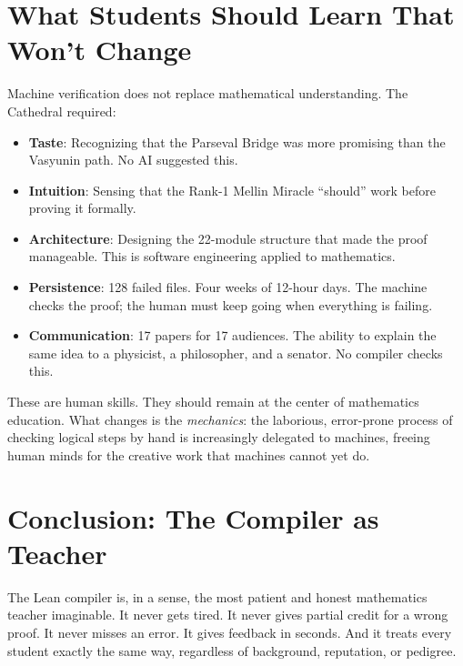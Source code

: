 \documentclass[11pt,a4paper]{article}
\begin{document}
\section{What Students Should Learn That Won't Change}

Machine verification does not replace mathematical understanding.
The Cathedral required:

\begin{itemize}
  \item \textbf{Taste}: Recognizing that the Parseval Bridge was
    more promising than the Vasyunin path. No AI suggested this.
  \item \textbf{Intuition}: Sensing that the Rank-1 Mellin Miracle
    ``should'' work before proving it formally.
  \item \textbf{Architecture}: Designing the 22-module structure
    that made the proof manageable. This is software engineering
    applied to mathematics.
  \item \textbf{Persistence}: 128 failed files. Four weeks of
    12-hour days. The machine checks the proof; the human must
    keep going when everything is failing.
  \item \textbf{Communication}: 17 papers for 17 audiences. The
    ability to explain the same idea to a physicist, a philosopher,
    and a senator. No compiler checks this.
\end{itemize}

These are human skills. They should remain at the center of
mathematics education. What changes is the \emph{mechanics}:
the laborious, error-prone process of checking logical steps by
hand is increasingly delegated to machines, freeing human minds
for the creative work that machines cannot yet do.

\section{Conclusion: The Compiler as Teacher}

The Lean compiler is, in a sense, the most patient and honest
mathematics teacher imaginable. It never gets tired. It never
gives partial credit for a wrong proof. It never misses an error.
It gives feedback in seconds. And it treats every student exactly
the same way, regardless of background, reputation, or pedigree.
\end{document}
